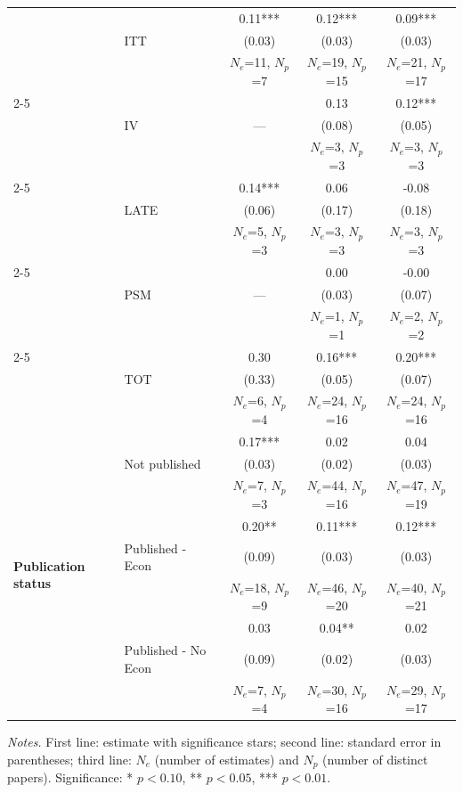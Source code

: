 \begin{table}[htbp]
\begin{tabular*}{\linewidth}{@{\extracolsep{\fill}} l l c c c @{}}
  &  & 0.11*** & 0.12*** & 0.09*** \\
  & ITT & (0.03) & (0.03) & (0.03) \\
  &  & $N_e$=11, $N_p$=7 & $N_e$=19, $N_p$=15 & $N_e$=21, $N_p$=17 \\
\cmidrule(lr){2-5}
  &  &  & 0.13 & 0.12*** \\
  & IV & --- & (0.08) & (0.05) \\
  &  &  & $N_e$=3, $N_p$=3 & $N_e$=3, $N_p$=3 \\
\cmidrule(lr){2-5}
  &  & 0.14*** & 0.06 & -0.08 \\
  & LATE & (0.06) & (0.17) & (0.18) \\
  &  & $N_e$=5, $N_p$=3 & $N_e$=3, $N_p$=3 & $N_e$=3, $N_p$=3 \\
\cmidrule(lr){2-5}
  &  &  & 0.00 & -0.00 \\
  & PSM & --- & (0.03) & (0.07) \\
  &  &  & $N_e$=1, $N_p$=1 & $N_e$=2, $N_p$=2 \\
\cmidrule(lr){2-5}
  &  & 0.30 & 0.16*** & 0.20*** \\
  & TOT & (0.33) & (0.05) & (0.07) \\
  &  & $N_e$=6, $N_p$=4 & $N_e$=24, $N_p$=16 & $N_e$=24, $N_p$=16 \\
\midrule
\multirow{9}{*}{\textbf{Publication status}}
  &  & 0.17*** & 0.02 & 0.04 \\
  & Not published & (0.03) & (0.02) & (0.03) \\
  &  & $N_e$=7, $N_p$=3 & $N_e$=44, $N_p$=16 & $N_e$=47, $N_p$=19 \\
\cmidrule(lr){2-5}
  &  & 0.20** & 0.11*** & 0.12*** \\
  & Published - Econ & (0.09) & (0.03) & (0.03) \\
  &  & $N_e$=18, $N_p$=9 & $N_e$=46, $N_p$=20 & $N_e$=40, $N_p$=21 \\
\cmidrule(lr){2-5}
  &  & 0.03 & 0.04** & 0.02 \\
  & Published - No Econ & (0.09) & (0.02) & (0.03) \\
  &  & $N_e$=7, $N_p$=4 & $N_e$=30, $N_p$=16 & $N_e$=29, $N_p$=17 \\
\bottomrule
\end{tabular*}

\vspace{0.3em} %
\parbox{\linewidth}{\scriptsize \textit{Notes.} First line: estimate with significance stars; second line: standard error in parentheses; third line: $N_e$ (number of estimates) and $N_p$ (number of distinct papers). Significance: * $p<0.10$, ** $p<0.05$, *** $p<0.01$.}
\end{table}
